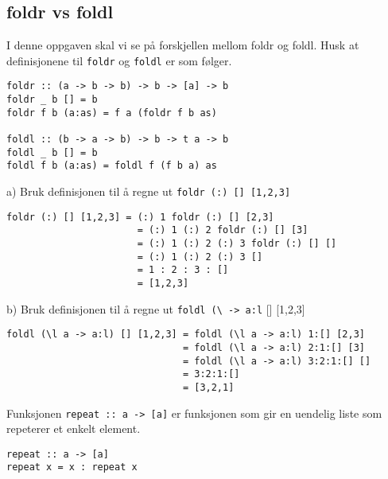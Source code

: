 \documentclass{article}
\begin{document}
    \subsection{foldr vs foldl}

    I denne oppgaven skal vi se på forskjellen mellom foldr og foldl. Husk at definisjonene til \texttt{foldr} og \texttt{foldl} er som følger.

    \begin{lstlisting}
foldr :: (a -> b -> b) -> b -> [a] -> b
foldr _ b [] = b
foldr f b (a:as) = f a (foldr f b as)

foldl :: (b -> a -> b) -> b -> t a -> b
foldl _ b [] = b
foldl f b (a:as) = foldl f (f b a) as
    \end{lstlisting}



    a) Bruk definisjonen til å regne ut \texttt{foldr (:) [] [1,2,3]}
    
    \begin{ans}
        \hspace{1em}
        \begin{lstlisting}
foldr (:) [] [1,2,3] = (:) 1 foldr (:) [] [2,3]
                       = (:) 1 (:) 2 foldr (:) [] [3]
                       = (:) 1 (:) 2 (:) 3 foldr (:) [] []
                       = (:) 1 (:) 2 (:) 3 []
                       = 1 : 2 : 3 : []
                       = [1,2,3]
        \end{lstlisting}
    \end{ans}
        b) Bruk definisjonen til å regne ut \texttt{foldl }\verb!(\!\texttt{ -> a:l} [] [1,2,3]
    \begin{ans}
        \hspace{1em}
        \begin{lstlisting}
foldl (\l a -> a:l) [] [1,2,3] = foldl (\l a -> a:l) 1:[] [2,3]
                               = foldl (\l a -> a:l) 2:1:[] [3]
                               = foldl (\l a -> a:l) 3:2:1:[] []
                               = 3:2:1:[]
                               = [3,2,1]
        \end{lstlisting}
    \end{ans}
    
    Funksjonen \texttt{repeat :: a -> [a]} er funksjonen som gir en uendelig liste som repeterer et enkelt element.

    \begin{lstlisting}
repeat :: a -> [a]
repeat x = x : repeat x
    \end{lstlisting}
\end{document}
